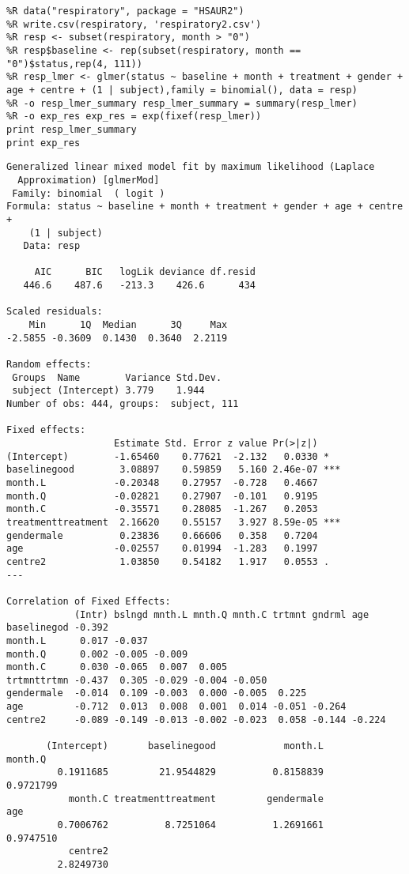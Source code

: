 \documentclass[12pt,fleqn]{article}\usepackage{../common}
\begin{document}
\begin{verbatim}
%R data("respiratory", package = "HSAUR2")
%R write.csv(respiratory, 'respiratory2.csv')
%R resp <- subset(respiratory, month > "0")
%R resp$baseline <- rep(subset(respiratory, month == "0")$status,rep(4, 111))
%R resp_lmer <- glmer(status ~ baseline + month + treatment + gender + age + centre + (1 | subject),family = binomial(), data = resp)
%R -o resp_lmer_summary resp_lmer_summary = summary(resp_lmer)
%R -o exp_res exp_res = exp(fixef(resp_lmer))
print resp_lmer_summary
print exp_res
\end{verbatim}

\begin{verbatim}
Generalized linear mixed model fit by maximum likelihood (Laplace
  Approximation) [glmerMod]
 Family: binomial  ( logit )
Formula: status ~ baseline + month + treatment + gender + age + centre +  
    (1 | subject)
   Data: resp

     AIC      BIC   logLik deviance df.resid 
   446.6    487.6   -213.3    426.6      434 

Scaled residuals: 
    Min      1Q  Median      3Q     Max 
-2.5855 -0.3609  0.1430  0.3640  2.2119 

Random effects:
 Groups  Name        Variance Std.Dev.
 subject (Intercept) 3.779    1.944   
Number of obs: 444, groups:  subject, 111

Fixed effects:
                   Estimate Std. Error z value Pr(>|z|)    
(Intercept)        -1.65460    0.77621  -2.132   0.0330 *  
baselinegood        3.08897    0.59859   5.160 2.46e-07 ***
month.L            -0.20348    0.27957  -0.728   0.4667    
month.Q            -0.02821    0.27907  -0.101   0.9195    
month.C            -0.35571    0.28085  -1.267   0.2053    
treatmenttreatment  2.16620    0.55157   3.927 8.59e-05 ***
gendermale          0.23836    0.66606   0.358   0.7204    
age                -0.02557    0.01994  -1.283   0.1997    
centre2             1.03850    0.54182   1.917   0.0553 .  
---

Correlation of Fixed Effects:
            (Intr) bslngd mnth.L mnth.Q mnth.C trtmnt gndrml age   
baselinegod -0.392                                                 
month.L      0.017 -0.037                                          
month.Q      0.002 -0.005 -0.009                                   
month.C      0.030 -0.065  0.007  0.005                            
trtmnttrtmn -0.437  0.305 -0.029 -0.004 -0.050                     
gendermale  -0.014  0.109 -0.003  0.000 -0.005  0.225              
age         -0.712  0.013  0.008  0.001  0.014 -0.051 -0.264       
centre2     -0.089 -0.149 -0.013 -0.002 -0.023  0.058 -0.144 -0.224

       (Intercept)       baselinegood            month.L            month.Q 
         0.1911685         21.9544829          0.8158839          0.9721799 
           month.C treatmenttreatment         gendermale                age 
         0.7006762          8.7251064          1.2691661          0.9747510 
           centre2 
         2.8249730 

\end{verbatim}
\end{document}
